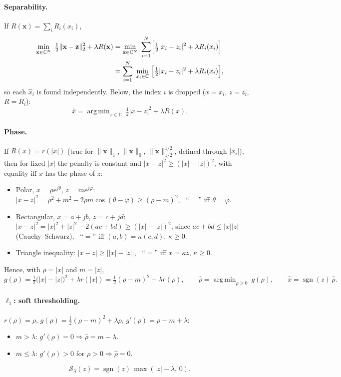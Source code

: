 \documentclass[11pt,a4paper]{article}
\theoremstyle{definition}
\newcommand{\C}{\mathbb{C}}
\DeclareMathOperator*{\argmin}{arg\,min}
\DeclareMathOperator{\sgn}{sgn}
\begin{document}
\paragraph{Separability.} If $R(\mathbf x) = \sum_i R_i(x_i)$,
\begin{align*}
  \min_{\mathbf x\in\C^N}\ \tfrac12\lVert \mathbf x - \mathbf z\rVert_2^2 + \lambda R(\mathbf x)
  &= \min_{\mathbf x\in\C^N}\ \sum_{i=1}^N \Bigl[\tfrac12|x_i - z_i|^2 + \lambda R_i(x_i)\Bigr] \\
  &= \sum_{i=1}^N\ \min_{x_i\in\C}\ \Bigl[\tfrac12|x_i - z_i|^2 + \lambda R_i(x_i)\Bigr],
\end{align*}
so each $\hat x_i$ is found independently. Below, the index $i$ is dropped ($x=x_i$, $z=z_i$, $R=R_i$):
\[
  \hat x = \argmin_{x\in\C}\ \tfrac12|x-z|^2 + \lambda R(x).
\]

\paragraph{Phase.} If $R(x) = r(|x|)$ (true for $\lVert\mathbf x\rVert_1$, $\lVert\mathbf x\rVert_0$, $\lVert\mathbf x\rVert_{1/2}^{1/2}$,
defined through $|x_i|$), then for fixed $|x|$ the penalty is constant and $|x-z|^2 \ge (|x|-|z|)^2$,
with equality iff $x$ has the phase of $z$:
\begin{itemize}
  \item Polar, $x=\rho e^{j\theta}$, $z=me^{j\varphi}$:
        $|x-z|^2 = \rho^2+m^2-2\rho m\cos(\theta-\varphi) \ge (\rho-m)^2$, \ ``$=$'' iff $\theta=\varphi$.
  \item Rectangular, $x=a+jb$, $z=c+jd$:
        $|x-z|^2 = |x|^2+|z|^2-2(ac+bd) \ge (|x|-|z|)^2$, since $ac+bd\le|x||z|$ (Cauchy--Schwarz),
        \ ``$=$'' iff $(a,b)=\kappa(c,d)$, $\kappa\ge0$.
  \item Triangle inequality: $|x-z| \ge \bigl||x|-|z|\bigr|$, \ ``$=$'' iff $x=\kappa z$, $\kappa\ge0$.
\end{itemize}
Hence, with $\rho=|x|$ and $m=|z|$,
\[
  g(\rho) = \tfrac12\bigl(|x|-|z|\bigr)^2 + \lambda r(|x|) = \tfrac12(\rho-m)^2 + \lambda r(\rho),\qquad
  \hat\rho = \argmin_{\rho\ge0}\ g(\rho),\qquad \hat x = \sgn(z)\,\hat\rho .
\]

\paragraph{$\ell_1$: soft thresholding.} $r(\rho)=\rho$, $g(\rho)=\tfrac12(\rho-m)^2+\lambda\rho$, $g'(\rho)=\rho-m+\lambda$:
\begin{itemize}
  \item $m>\lambda$: $g'(\rho)=0 \Rightarrow \hat\rho = m-\lambda$.
  \item $m\le\lambda$: $g'(\rho)>0$ for $\rho>0 \Rightarrow \hat\rho = 0$.
\end{itemize}
\[
  \mathcal S_\lambda(z) = \sgn(z)\,\max(|z|-\lambda,\,0).
\]
\end{document}
